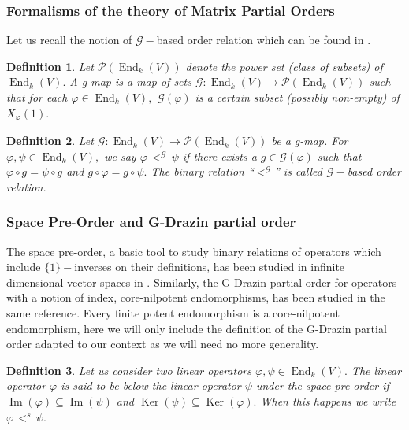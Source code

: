 \documentclass[10pt,a4paper]{amsart}
\newtheorem{defn}{Definition}
\theoremstyle{plain}
\theoremstyle{remark}
\numberwithin{equation}{section} \numberwithin{defn}{section}
\newcommand\ed{\operatorname{End}}
\newcommand{\Img}{\operatorname{Im}}
\newcommand\Ker{\operatorname{Ker}}
\newcommand{\f}{\varphi}
\newcommand{\g}{\psi}
\begin{document}
\subsubsection{Formalisms of the theory of Matrix Partial Orders}\label{ss: Formalisms}
Let us recall the notion of $\mathcal{G}-$based order relation which can be found in \cite[Chapter 7]{Ind}.
\begin{defn}\cite[Definition 7.2.1]{Ind}
Let $\mathcal{P}(\ed_k(V))$ denote the power set (class of subsets) of $\ed_k(V).$ A g-map is a map of sets $\mathcal{G}\colon \ed_k(V)\to \mathcal{P}(\ed_k(V))$ such that for each $\f \in \ed_k(V),$ $\mathcal{G}(\f)$ is a certain subset (possibly non-empty) of $X_{\f}(1).$
\end{defn}

\begin{defn}\cite[Definition 7.2.3]{Ind}\label{D: G-based rel}
Let $\mathcal{G}\colon \ed_k(V)\to \mathcal{P}(\ed_k(V))$ be a g-map. For $\f, \g \in \ed_k(V),$ we say $\f \, <^{\mathcal{G}} \, \g$ if there exists a $g\in \mathcal{G}(\f)$ such that $\f \circ g=\g \circ g$ and $g\circ \f=g\circ \g .$ The binary relation ``$<^{\mathcal{G}}$'' is called $\mathcal{G}-$based order relation.
\end{defn}


\subsubsection{Space Pre-Order and G-Drazin partial order}\label{ss: Space}

The space pre-order, a basic tool to study binary relations of operators which include $\{1\}-$inverses on their definitions, has been studied in infinite dimensional vector spaces in \cite{RendDaa}. Similarly, the G-Drazin partial order for operators with a notion of index, core-nilpotent endomorphisms, has been studied in the same reference. Every finite potent endomorphism is a core-nilpotent endomorphism, here we will only include the definition of the G-Drazin partial order adapted to our context as we will need no more generality.

\begin{defn}\cite[Definition 3.2]{RendDaa}\label{D: Space Pre-Ord}
Let us consider two linear operators $\f, \g \in \ed_k(V).$ The linear operator $\f$ is said to be below the linear operator $\g$ under the space pre-order if $\Img(\f)\subseteq \Img(\g)$ and $\Ker(\g)\subseteq \Ker(\f).$ When this happens we write $\f \, <^s \, \g .$
\end{defn}
\end{document}
